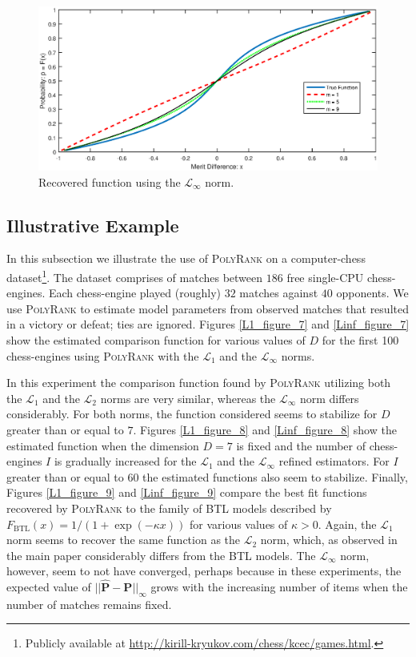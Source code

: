 \documentclass[twoside,11pt]{article}
\begin{document}
\begin{figure}
  \centering
    \includegraphics[width=1\textwidth]{Linf_figure_6}
    \caption{Recovered function  using the $\mathcal{L}_{\infty}$ norm. \label{Linf_figure_6}}
\end{figure}



\subsection{Illustrative Example}

In this subsection we illustrate the use of \textsc{PolyRank} on a computer-chess dataset\footnote{Publicly available at \url{http://kirill-kryukov.com/chess/kcec/games.html}.}. The dataset comprises of matches between $186$ free single-CPU chess-engines. Each chess-engine played (roughly) $32$ matches against $40$  opponents. We use \textsc{PolyRank} to estimate model parameters from observed matches that resulted in a victory or defeat; ties are ignored. Figures \ref{L1_figure_7} and \ref{Linf_figure_7} show the estimated comparison function for various values of $D$ for the first 100 chess-engines using \textsc{PolyRank} with the $\mathcal{L}_1$ and the $\mathcal{L}_{\infty}$ norms.

In this experiment the comparison function found by \textsc{PolyRank}
utilizing both the $\mathcal{L}_1$ and the $\mathcal{L}_2$ norms are very similar, whereas the $\mathcal{L}_{\infty}$ norm differs considerably. For both norms, the function considered seems to stabilize for  $D$ greater than or equal to $7$. Figures \ref{L1_figure_8} and \ref{Linf_figure_8} show the estimated function when the dimension $D = 7$ is fixed and the number of chess-engines $I$ is gradually increased for the $\mathcal{L}_1$ and the $\mathcal{L}_{\infty}$ refined estimators. For $I$ greater than or equal to $60$ the estimated functions also seem to stabilize. Finally, Figures \ref{L1_figure_9} and \ref{Linf_figure_9} compare the best fit functions recovered by \textsc{PolyRank} to the family of BTL models described by $F_{\text{BTL}}(x) = 1/(1+\exp(-\kappa x))$ for various values of $\kappa >0$. Again, the $\mathcal{L}_1$ norm seems to recover the same function as the $\mathcal{L}_2$ norm, which, as observed in the main paper considerably differs from the BTL models. The $\mathcal{L}_{\infty}$ norm, however, seem to not have converged, perhaps because in these experiments, the expected value of $||\hat{\boldsymbol{P}}- \boldsymbol{P}||_{\infty}$ grows with the increasing number of items when the number of matches remains fixed.
\end{document}
